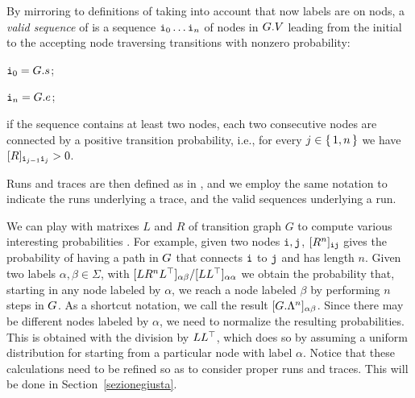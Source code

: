 %


By mirroring to definitions of  taking into account that now labels are on nods, a \emph{valid sequence} of \tg is a sequence $\textnormal{\texttt{i}}_0\ldots\textnormal{\texttt{i}}_n$ of nodes in $G.V$ leading from the initial to the accepting node traversing transitions with nonzero probability:
\begin{inparaenum}[\it (i)]
\item $\textnormal{\texttt{i}}_0 = G.s$;
\item $\textnormal{\texttt{i}}_n = G.e$;
\item if the sequence contains at least two nodes, each two consecutive nodes are connected by a positive transition probability, i.e., for every $j \in \set{1,n}$ we have $[R]_{\textnormal{\texttt{i}}_{j-1}\textnormal{\texttt{i}}_{j}} > 0$.
\end{inparaenum}
Runs and traces are then defined as in , and we employ the same notation to indicate the runs underlying a trace, and the valid sequences underlying a run.

We can play with matrixes $L$ and $R$ of transition graph $G$ to compute various interesting probabilities \cite{GartnerFW03}. For example, given two nodes $\textnormal{\texttt{i}},\textnormal{\texttt{j}}$, $[R^n]_{\textnormal{\texttt{i}}\textnormal{\texttt{j}}}$ gives the probability of having a path in $G$ that connects $\textnormal{\texttt{i}}$ to $\textnormal{\texttt{j}}$ and has length $n$. Given two labels $\alpha,\beta \in \Sigma$, with $[LR^nL^\top]_{\alpha\beta}/[LL^\top]_{\alpha\alpha}$ we obtain the probability that, starting in any node labeled by $\alpha$, we reach a node labeled $\beta$ by performing $n$ steps in $G$. As a shortcut notation, we call the result $[G.\Lambda^n]_{\alpha\beta}$. Since there may be different nodes labeled by $\alpha$, we need to normalize the resulting probabilities. This is obtained with the division by $LL^\top$, which does so by assuming a uniform distribution for starting from a particular node with label $\alpha$. Notice that these calculations need to be refined so as to consider proper runs and traces. This will be done in Section~\ref{sezionegiusta}. 



